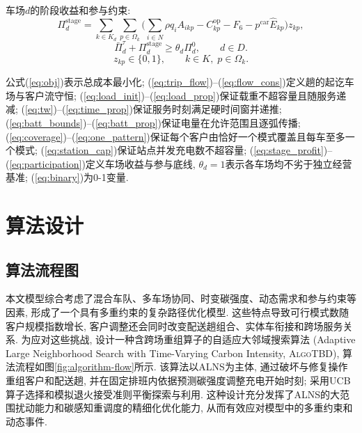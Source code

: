 \documentclass{setp-new}
\begin{document}
车场$d$的阶段收益和参与约束:
\begin{equation}
\Pi_d^{\mathrm{stage}}=\sum_{k\in K_d}\sum_{p\in\Omega_k}
\bigl(\sum_{i\in N}\rho q_iA_{ikp}-C_{kp}^{\mathrm{op}}-F_6-p^{\mathrm{car}}\widehat E_{kp}\bigr)z_{kp},
\label{eq:stage_profit}
\end{equation}
\begin{equation}
\bar\Pi_d^\tau+\Pi_d^{\mathrm{stage}}\ge\theta_d\Pi_d^0,\qquad d\in D.
\label{eq:participation}
\end{equation}
\begin{equation}
z_{kp}\in\{0,1\},\qquad k\in K,\;p\in\Omega_k.
\label{eq:binary}
\end{equation}

公式(\ref{eq:obj})表示总成本最小化;
(\ref{eq:trip_flow})--(\ref{eq:flow_cons})定义趟的起讫车场与客户流守恒;
(\ref{eq:load_init})--(\ref{eq:load_prop})保证载重不超容量且随服务递减;
(\ref{eq:tw})--(\ref{eq:time_prop})保证服务时刻满足硬时间窗并递推;
(\ref{eq:batt_bounds})--(\ref{eq:batt_prop})保证电量在允许范围且逐弧传播;
(\ref{eq:coverage})--(\ref{eq:one_pattern})保证每个客户由恰好一个模式覆盖且每车至多一个模式;
(\ref{eq:station_cap})保证站点并发充电数不超容量;
(\ref{eq:stage_profit})--(\ref{eq:participation})定义车场收益与参与底线,
$\theta_d=1$表示各车场均不劣于独立经营基准;
(\ref{eq:binary})为0-1变量.

\section{算法设计}

\subsection{算法流程图}

本文模型综合考虑了混合车队、多车场协同、时变碳强度、动态需求和参与约束等因素,
形成了一个具有多重约束的复杂路径优化模型.
这些特点导致可行模式数随客户规模指数增长,
客户调整还会同时改变配送趟组合、实体车衔接和跨场服务关系.
为应对这些挑战, 设计一种含跨场重组算子的自适应大邻域搜索算法
(Adaptive Large Neighborhood Search with Time-Varying Carbon Intensity,
\textsc{AlgoTBD}), 算法流程如图\ref{fig:algorithm-flow}所示.
该算法以ALNS\cite{ref:66}为主体,
通过破坏与修复操作重组客户和配送趟,
并在固定排班内依据预测碳强度调整充电开始时刻;
采用UCB算子选择\cite{ref:68}和模拟退火接受准则\cite{ref:69}平衡探索与利用.
这种设计充分发挥了ALNS的大范围扰动能力和碳感知重调度的精细化优化能力,
从而有效应对模型中的多重约束和动态事件.
\end{document}
